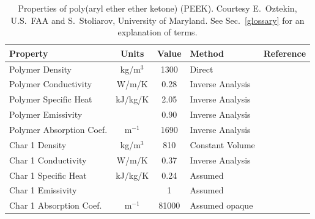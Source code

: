 \begin{table}[p]
\caption[Properties of poly(aryl ether ether ketone) (PEEK)]{Properties of poly(aryl ether ether ketone) (PEEK). Courtesy E.~Oztekin, U.S.~FAA and S.~Stoliarov,
University of Maryland. See Sec.~\ref{glossary} for an explanation of terms.}
\begin{center}
\begin{tabular}{|l|c|c|l|l|}
\hline
Property                    & Units         & Value                             & Method                    &  Reference                              \\ \hline \hline
Polymer Density             & kg/m$^3$      & 1300                              & Direct                    &  \cite{Oztekin:CF2012}                  \\ \hline
Polymer Conductivity        & W/m/K         & 0.28                              & Inverse Analysis          &  \cite{Oztekin:CF2012}                  \\ \hline
Polymer Specific Heat       & kJ/kg/K       & 2.05                              & Inverse Analysis          &  \cite{Oztekin:CF2012}                  \\ \hline
Polymer Emissivity          &               & 0.90                              & Inverse Analysis          &  \cite{Oztekin:CF2012}                  \\ \hline
Polymer Absorption Coef.    & m$^{-1}$      & 1690                              & Inverse Analysis          &  \cite{Oztekin:CF2012}                  \\ \hline
Char 1 Density              & kg/m$^3$      & 810                               & Constant Volume           &  \cite{Oztekin:CF2012}                  \\ \hline
Char 1 Conductivity         & W/m/K         & 0.37                              & Inverse Analysis          &  \cite{Oztekin:CF2012}                  \\ \hline
Char 1 Specific Heat        & kJ/kg/K       & 0.24                              & Assumed                   &  \cite{Oztekin:CF2012}                  \\ \hline
Char 1 Emissivity           &               & 1                                 & Assumed                   &  \cite{Oztekin:CF2012}                  \\ \hline
Char 1 Absorption Coef.     & m$^{-1}$      & 81000                             & Assumed opaque            &  \cite{Oztekin:CF2012}                  \\ \hline

\end{tabular}
\end{center}
\end{table}

